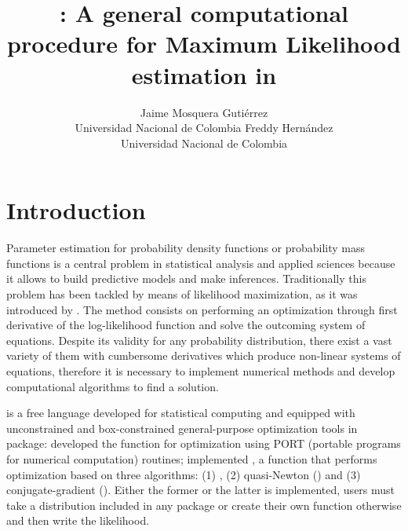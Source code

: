 \documentclass[nojss]{jss}
\author{Jaime Mosquera Guti\'errez\\Universidad Nacional de Colombia
   \And Freddy Hern\'andez\\Universidad Nacional de Colombia}
\title{\pkg{maxlogL}: A general computational procedure for Maximum Likelihood estimation in \proglang{R}}
\begin{document}



\section{Introduction} \label{sec:intro}

Parameter estimation for probability density functions or probability mass functions is a central problem in statistical analysis and applied sciences because it allows to build predictive models and make inferences. Traditionally
this problem has been tackled by means of likelihood maximization, as it was introduced by \cite{Fisher1912}. The method consists on performing an optimization through first derivative of the log-likelihood function and solve the outcoming system of equations. Despite its validity for any probability distribution, there exist a vast variety of them with cumbersome derivatives which produce non-linear systems of equations, therefore it is necessary to implement numerical methods and develop computational algorithms to find a solution.

 \citep{R2019} is a free language developed for statistical computing and equipped with unconstrained and box-constrained general-purpose optimization tools in  package: \cite{Fox1978} developed the function  for optimization using PORT (portable  programs for numerical computation) routines; \cite{Nash1979} implemented , a function that performs optimization based on three algorithms: (1) \cite{Nelder1965}, (2) quasi-Newton () and (3) conjugate-gradient (). Either the former or the latter is implemented, users must take a distribution included in any package or create their own function otherwise and then write the likelihood.
\end{document}
